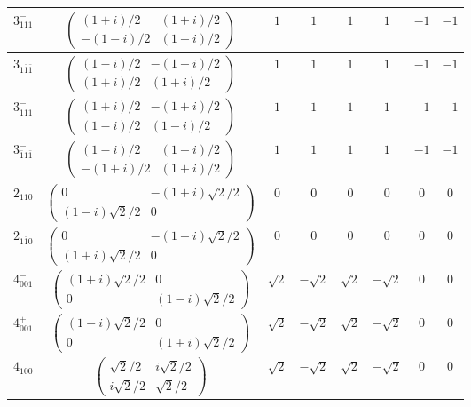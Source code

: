 \documentclass[3p,preprint]{elsarticle}
\begin{document}
\begin{table}[H]
{\begin{tabular}{|c|c||c|c|c|c|c|c|}
			$3^{-}_{111}$ &		$\left(\begin{array}{cc} (1+i)/2&(1+i)/2 \\ -(1-i)/2&(1-i)/2 \end{array}\right)$	&$1$ & $1$ & $1$ & $1$ & $-1$ & $-1$ \\ \hline
			$3^{-}_{1\bar{1}\bar{1}}$ &		$\left(\begin{array}{cc} (1-i)/2&-(1-i)/2 \\ (1+i)/2&(1+i)/2 \end{array}\right)$	&$1$ & $1$ & $1$ & $1$ & $-1$ & $-1$ \\ \hline
			$3^{-}_{\bar{1}\bar{1}1}$ &		$\left(\begin{array}{cc} (1+i)/2&-(1+i)/2 \\ (1-i)/2&(1-i)/2 \end{array}\right)$	&$1$ & $1$ & $1$ & $1$ & $-1$ & $-1$ \\ \hline
			$3^{-}_{\bar{1}1\bar{1}}$ &		$\left(\begin{array}{cc} (1-i)/2&(1-i)/2 \\ -(1+i)/2&(1+i)/2 \end{array}\right)$	&$1$ & $1$ & $1$ & $1$ & $-1$ & $-1$ \\ \hline
			$2_{110}$ &		$\left(\begin{array}{cc} 0&-(1+i)\sqrt{2}/2 \\ (1-i)\sqrt{2}/2&0 \end{array}\right)$	&$0$ & $0$ & $0$ & $0$ & $0$ & $0$ \\ \hline
			$2_{1\bar{1}0}$ &		$\left(\begin{array}{cc} 0&-(1-i)\sqrt{2}/2 \\ (1+i)\sqrt{2}/2&0 \end{array}\right)$	&$0$ & $0$ & $0$ & $0$ & $0$ & $0$ \\ \hline
			$4^{-}_{001}$ &		$\left(\begin{array}{cc} (1+i)\sqrt{2}/2&0 \\ 0&(1-i)\sqrt{2}/2 \end{array}\right)$	&$\sqrt{2}$ & $-\sqrt{2}$ & $\sqrt{2}$ & $-\sqrt{2}$ & $0$ & $0$ \\ \hline
			$4^{+}_{001}$ &		$\left(\begin{array}{cc} (1-i)\sqrt{2}/2&0 \\ 0&(1+i)\sqrt{2}/2 \end{array}\right)$	&$\sqrt{2}$ & $-\sqrt{2}$ & $\sqrt{2}$ & $-\sqrt{2}$ & $0$ & $0$ \\ \hline
			$4^{-}_{100}$ &		$\left(\begin{array}{cc} \sqrt{2}/2&i\sqrt{2}/2 \\ i\sqrt{2}/2&\sqrt{2}/2 \end{array}\right)$	&$\sqrt{2}$ & $-\sqrt{2}$ & $\sqrt{2}$ & $-\sqrt{2}$ & $0$ & $0$ \\ \hline

\end{tabular}}
\end{table}
\end{document}
